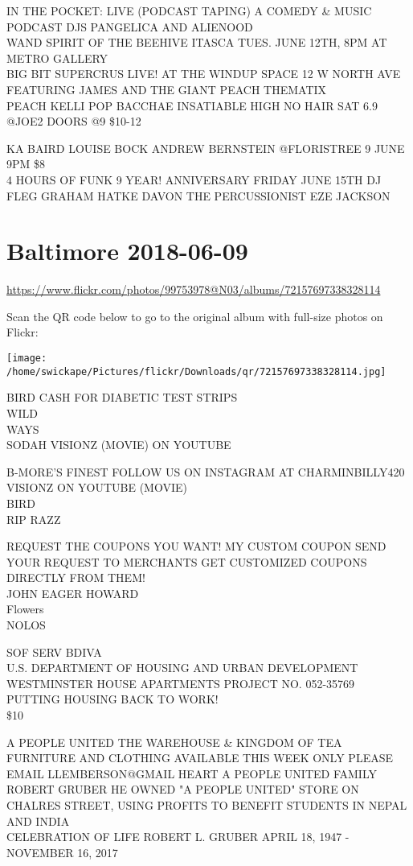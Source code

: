 \documentclass[10pt,letterpaper]{article}
\begin{document}
IN THE POCKET: LIVE (PODCAST TAPING) A COMEDY \& MUSIC PODCAST DJS PANGELICA AND ALIENOOD\\
WAND SPIRIT OF THE BEEHIVE ITASCA TUES. JUNE 12TH, 8PM AT METRO GALLERY\\
BIG BIT SUPERCRUS LIVE! AT THE WINDUP SPACE 12 W NORTH AVE FEATURING JAMES AND THE GIANT PEACH THEMATIX\\
PEACH KELLI POP BACCHAE INSATIABLE HIGH NO HAIR SAT 6.9 @JOE2 DOORS @9 \$10{-}12

KA BAIRD LOUISE BOCK ANDREW BERNSTEIN @FLORISTREE 9 JUNE 9PM \$8\\
4 HOURS OF FUNK 9 YEAR! ANNIVERSARY FRIDAY JUNE 15TH DJ FLEG GRAHAM HATKE DAVON THE PERCUSSIONIST EZE JACKSON


\section*{Baltimore 2018-06-09}

\url{https://www.flickr.com/photos/99753978@N03/albums/72157697338328114}

Scan the QR code below to go to the original album with full-size photos on Flickr:

\texttt{[image: /home/swickape/Pictures/flickr/Downloads/qr/72157697338328114.jpg]}


BIRD CASH FOR DIABETIC TEST STRIPS\\
WILD\\
WAYS\\
SODAH VISIONZ (MOVIE) ON YOUTUBE

B{-}MORE'S FINEST FOLLOW US ON INSTAGRAM AT CHARMINBILLY420\\
VISIONZ ON YOUTUBE (MOVIE)\\
BIRD\\
RIP RAZZ

REQUEST THE COUPONS YOU WANT!  MY CUSTOM COUPON SEND YOUR REQUEST TO MERCHANTS GET CUSTOMIZED COUPONS DIRECTLY FROM THEM!\\
JOHN EAGER HOWARD\\
Flowers\\
NOLOS

SOF SERV BDIVA\\
U.S. DEPARTMENT OF HOUSING AND URBAN DEVELOPMENT WESTMINSTER HOUSE APARTMENTS PROJECT NO. 052{-}35769\\
PUTTING HOUSING BACK TO WORK!\\
\$10

A PEOPLE UNITED THE WAREHOUSE \& KINGDOM OF TEA\\
FURNITURE AND CLOTHING AVAILABLE THIS WEEK ONLY PLEASE EMAIL LLEMBERSON@GMAIL HEART A PEOPLE UNITED FAMILY\\
ROBERT GRUBER HE OWNED "A PEOPLE UNITED" STORE ON CHALRES STREET, USING PROFITS TO BENEFIT STUDENTS IN NEPAL AND INDIA\\
CELEBRATION OF LIFE ROBERT L. GRUBER APRIL 18, 1947 {-} NOVEMBER 16, 2017
\end{document}
